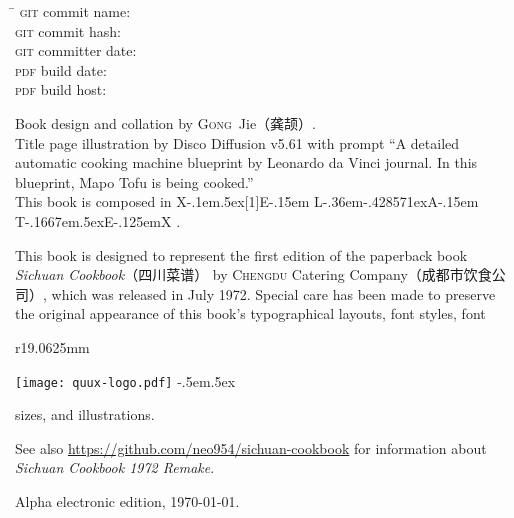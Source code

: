 \vfill

\setlength{\parskip}{.3125\baselineskip}%
\vspace{-2\baselineskip}
\begin{tabbing}
\hspace{9.5625em}\= \kill
\textsc{git} commit name:       \>\texttt{\gitcommitname}\\
\textsc{git} commit hash:       \>\texttt{\gitcommithash}\\
\textsc{git} committer date:    \>\texttt{\gitcommitterdate}\\
\textsc{pdf} build date:        \>\texttt{\pdfbuilddate}\\
\textsc{pdf} build host:        \>\texttt{\pdfbuildhost}
\end{tabbing}
\vspace{-1\baselineskip}

Book design and collation by \textsc{Gong}~Jie\!（龚颉）\!\!.\\
Title page illustration by Disco Diffusion v5.61 with prompt ``A detailed
automatic cooking machine blueprint by Leonardo da Vinci journal. In this
blueprint, Mapo Tofu is being cooked.''\\
This book is composed in
\begingroup%
\rmfamily%
\footnotesize%
X\kern-.1em\lower.5ex\hbox{\scalebox{-1}[1]{E}}\kern-.15em%
L\kern-.36em\lower-.428571ex\hbox{\tiny{A}}\kern-.15em%
T\kern-.1667em\lower.5ex\hbox{E}\kern-.125emX%
\endgroup%
.

This book is designed to represent the first edition of the paperback book
\textit{Sichuan Cookbook}{\kafamily（四川菜谱）}\!\! by \textsc{Chengdu}
Catering Company\!（成都市饮食公司）\!\!, which was released in July 1972.
Special care has been made to preserve the original appearance of this book's
typographical layouts, font styles, font
\begin{wrapfigure}{r}{19.0625mm}%
\vspace{-1.25\baselineskip}%
\begin{flushright}%
\quad\texttt{[image: quux-logo.pdf]}%
{\sffamily\tiny\kern-.5em\lower.5ex\hbox{\texttrademark}}%
\end{flushright}%
\vspace{-1.75\baselineskip}%
\end{wrapfigure}%
sizes, and illustrations.

See also \url{https://github.com/neo954/sichuan-cookbook} for information
about \textit{Sichuan Cookbook 1972 Remake}.

Alpha electronic edition, \today.

\endgroup%

